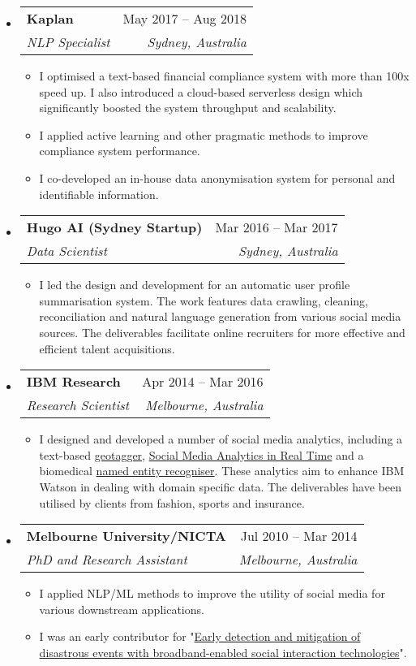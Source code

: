 \documentclass[letterpaper,12pt]{article}[leftmargin=*]
\makeatletter
\def \entryspacing {-0pt}
\newcommand{\resumeEntryStart}{\begin{itemize}[leftmargin=2.5mm]}
\newcommand{\resumeEntryEnd}{\end{itemize}\vspace{\entryspacing}}
\newcommand{\resumeItemListStart}{\begin{itemize}[leftmargin=4.5mm]}
\newcommand{\resumeItemListEnd}{\end{itemize}}
\newcommand{\resumeItem}[1]{
  \item\small{
    {#1 \vspace{-2pt}}
  }
}
\newcommand{\resumeEntryTSDL}[4]{
  \vspace{-1pt}\item[]
    \begin{tabularx}{0.97\textwidth}{X@{\hspace{60pt}}r}
      \textbf{\color{primary}#1} & {\firabook\color{accent}\small#2} \\
      \textit{\color{accent}\small#3} & \textit{\color{accent}\small#4} \\
    \end{tabularx}\vspace{-6pt}
}
\makeatother
\begin{document}
  \resumeEntryStart
    \resumeEntryTSDL
      {Kaplan}{May 2017 -- Aug 2018}
      {NLP Specialist}{Sydney, Australia}
    \resumeItemListStart
      \resumeItem {I optimised a text-based financial compliance system with more than 100x speed up. I also introduced a cloud-based serverless design which significantly boosted the system throughput and scalability.}
      \resumeItem {I applied active learning and other pragmatic methods to improve compliance system performance.}
      \resumeItem {I co-developed an in-house data anonymisation system for personal and identifiable information.}
    \resumeItemListEnd
  \resumeEntryEnd

  \resumeEntryStart
    \resumeEntryTSDL
      {Hugo AI (Sydney Startup)}{Mar 2016 -- Mar 2017}
      {Data Scientist}{Sydney, Australia}
    \resumeItemListStart
        \resumeItem {I led the design and development for an automatic user profile summarisation system. The work features data crawling, cleaning, reconciliation and natural language generation from various social media sources. The deliverables facilitate online recruiters for more effective and efficient talent acquisitions.}
    \resumeItemListEnd
  \resumeEntryEnd

  \resumeEntryStart
    \resumeEntryTSDL
      {IBM Research}{Apr 2014 -- Mar 2016}
      {Research Scientist}{Melbourne, Australia}
    \resumeItemListStart
      \resumeItem {I designed and developed a number of social media analytics, including a text-based \href{http://researcher.watson.ibm.com/researcher/view_group.php?id=6349}{geotagger}, \href{http://researcher.watson.ibm.com/researcher/view_group.php?id=6350}{Social Media Analytics in Real Time} and a biomedical \href{http://researcher.watson.ibm.com/researcher/view_group_pubs.php?grp=5727}{named entity recogniser}. These analytics aim to enhance IBM Watson in dealing with domain specific data. The deliverables have been utilised by clients from fashion, sports and insurance.}
    \resumeItemListEnd
  \resumeEntryEnd

  \resumeEntryStart
    \resumeEntryTSDL
      {Melbourne University/NICTA}{Jul 2010 -- Mar 2014}
      {PhD and Research Assistant}{Melbourne, Australia}
    \resumeItemListStart
      \resumeItem {I applied NLP/ML methods to improve the utility of social media for various downstream applications.}
      \resumeItem {I was an early contributor for "\href{http://research.unimelb.edu.au/__data/assets/pdf_file/0006/1891914/IBES-2012-Annual-Report.pdf}{Early detection and mitigation of disastrous events with broadband-enabled social interaction technologies}".}
    \resumeItemListEnd
  \resumeEntryEnd
\end{document}
